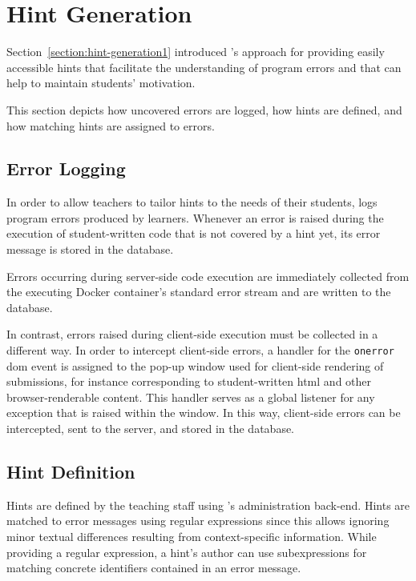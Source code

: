 \section{Hint Generation}\label{section:hint-generation2}

Section~\ref{section:hint-generation1} introduced \tool's approach for providing easily accessible hints that facilitate the understanding of program errors and that can help to maintain students' motivation.

This section depicts how uncovered errors are logged, how hints are defined, and how matching hints are assigned to errors.

\subsection{Error Logging}

In order to allow teachers to tailor hints to the needs of their students, \tool logs program errors produced by learners. Whenever an error is raised during the execution of student-written code that is not covered by a hint yet, its error message is stored in the database.

Errors occurring during server-side code execution are immediately collected from the executing Docker container's standard error stream and are written to the database.

In contrast, errors raised during client-side execution must be collected in a different way. In order to intercept client-side errors, a handler for the \texttt{onerror} \gls{dom} event is assigned to the pop-up window used for client-side rendering of submissions, for instance corresponding to student-written \gls{html} and other browser-renderable content. This handler serves as a global listener for any exception that is raised within the window. In this way, client-side errors can be intercepted, sent to the server, and stored in the database.

\subsection{Hint Definition}

Hints are defined by the teaching staff using \tool's administration back-end. Hints are matched to error messages using regular expressions since this allows ignoring minor textual differences resulting from context-specific information. While providing a regular expression, a hint's author can use subexpressions for matching concrete identifiers contained in an error message.

